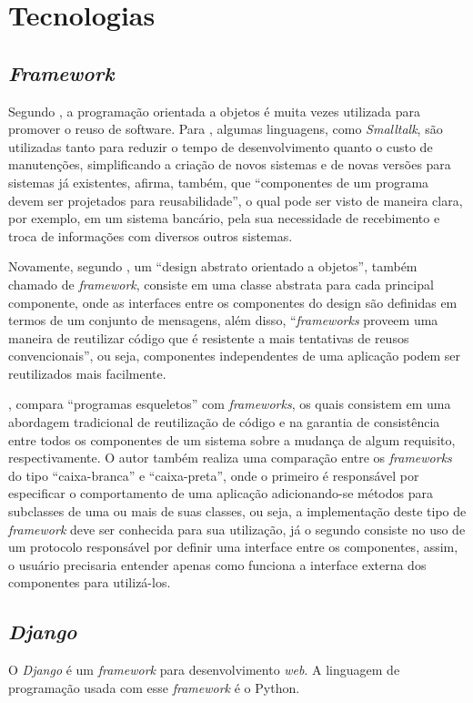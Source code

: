 \chapter{Tecnologias}

\section{\textit{Framework}}
Segundo , a programação orientada a objetos é muita vezes utilizada para promover o reuso de software. Para , algumas linguagens, como \textit{Smalltalk}, são utilizadas tanto para reduzir o tempo de desenvolvimento quanto o custo de manutenções, simplificando a criação de novos sistemas e de novas versões para sistemas já existentes, afirma, também, que “componentes de um programa devem ser projetados para reusabilidade”, o qual pode ser visto de maneira clara, por exemplo, em um sistema bancário, pela sua necessidade de recebimento e troca de informações com diversos outros sistemas.

Novamente, segundo , um “design abstrato orientado a objetos”, também chamado de \textit{framework}, consiste em uma classe abstrata para cada principal componente, onde as interfaces entre os componentes do design são definidas em termos de um conjunto de mensagens, além disso, “\textit{frameworks} proveem uma maneira de reutilizar código que é resistente a mais tentativas de reusos convencionais”, ou seja, componentes independentes de uma aplicação podem ser reutilizados mais facilmente.

, compara “programas esqueletos” com \textit{frameworks}, os quais consistem em uma abordagem tradicional de reutilização de código e na garantia de consistência entre todos os componentes de um sistema sobre a mudança de algum requisito, respectivamente. O autor também realiza uma comparação entre os \textit{frameworks} do tipo “caixa-branca” e “caixa-preta”, onde o primeiro é responsável por especificar o comportamento de uma aplicação adicionando-se métodos para subclasses de uma ou mais de suas classes, ou seja, a implementação deste tipo de \textit{framework} deve ser conhecida para sua utilização, já o segundo consiste no uso de um protocolo responsável por definir uma interface entre os componentes, assim, o usuário precisaria entender apenas como funciona a interface externa dos componentes para utilizá-los.

\section{\textit{Django}}
O \textit{Django} é um \textit{framework} para desenvolvimento \textit{web}. A linguagem de programação usada com esse \textit{framework} é o Python.

